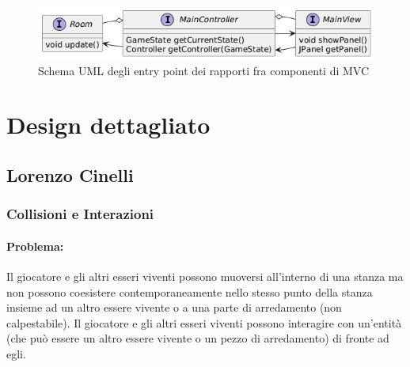 \documentclass[a4paper,12pt]{report}
\begin{document}
\begin{figure}[H]
	\centering{}
	\includegraphics[width=\textwidth]{img/mvc.png}
	\caption{Schema UML degli entry point dei rapporti fra componenti di MVC}
	\label{img:mvc}
\end{figure}

\section{Design dettagliato}

\subsection{Lorenzo Cinelli}

\subsubsection{Collisioni e Interazioni}

\paragraph{Problema:} Il giocatore e gli altri esseri viventi possono muoversi all'interno di una stanza ma non possono coesistere 
contemporaneamente nello stesso punto della stanza insieme ad un altro essere vivente o a una parte di arredamento (non calpestabile).
Il giocatore e gli altri esseri viventi possono interagire con un'entità (che può essere un altro essere vivente o un pezzo di arredamento)
di fronte ad egli. 
\end{document}
